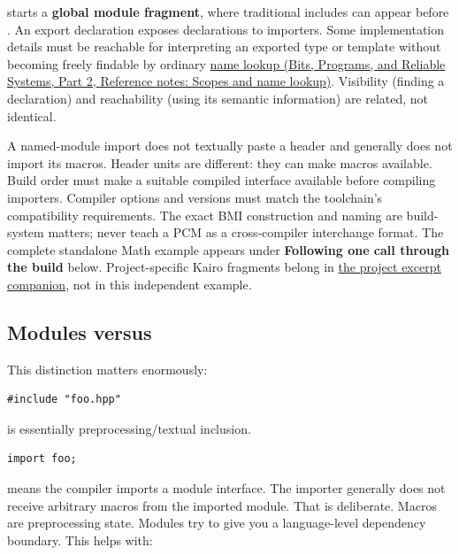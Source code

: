  starts a \textbf{global module fragment}, where traditional includes can appear before . An export declaration exposes declarations to importers. Some implementation details must be reachable for interpreting an exported type or template without becoming freely findable by ordinary \href{../01-Bits-Programs-and-Reliable-Systems-P02/main.pdf\#nameddest=appendix-b12b31759da1}{name lookup (Bits, Programs, and Reliable Systems, Part 2, Reference notes: Scopes and name lookup)}. Visibility (finding a declaration) and reachability (using its semantic information) are related, not identical.

A named-module import does not textually paste a header and generally does not import its macros. Header units are different: they can make macros available. Build order must make a suitable compiled interface available before compiling importers. Compiler options and versions must match the toolchain's compatibility requirements. The exact BMI construction and naming are build-system matters; never teach a PCM as a cross-compiler interchange format. The complete standalone Math example appears under \textbf{Following one call through the build} below. Project-specific Kairo fragments belong in \hyperref[appendix-4e2236f53445-source-reported-c-project-excerpts]{the project excerpt companion}, not in this independent example.

\subsection{\texorpdfstring{Modules versus }{Modules versus \#include}}\label{05-engine-i-ch002-modules-versus-include}

\hypertarget{05-engine-i-ch002-modules-versus-include}{}

This distinction matters enormously:

\begin{verbatim}
#include "foo.hpp"
\end{verbatim}

is essentially preprocessing/textual inclusion.

\begin{verbatim}
import foo;
\end{verbatim}

means the compiler imports a module interface. The importer generally does not receive arbitrary macros from the imported module. That is deliberate. Macros are preprocessing state. Modules try to give you a language-level dependency boundary. This helps with:

